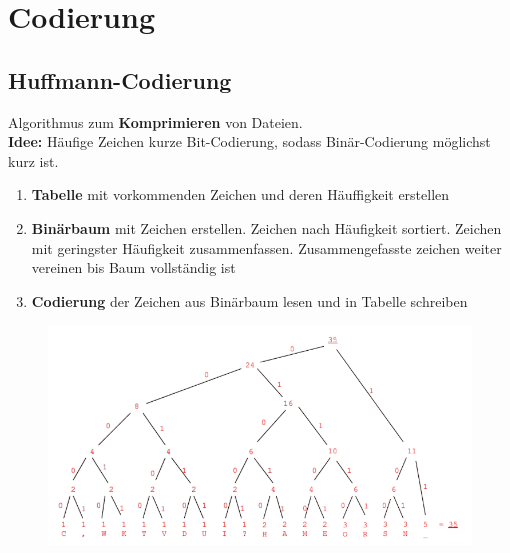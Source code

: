 \documentclass[12pt,a4paper]{article}
\begin{document}
		\newpage
	\section{Codierung}
		\subsection{Huffmann-Codierung}
			Algorithmus zum \textbf{Komprimieren} von Dateien.\\
			\textbf{Idee:} Häufige Zeichen kurze Bit-Codierung, sodass Binär-Codierung möglichst kurz ist.
			\begin{enumerate}
				\item \textbf{Tabelle} mit vorkommenden Zeichen und deren Häuffigkeit erstellen
				\item \textbf{Binärbaum} mit Zeichen erstellen. Zeichen nach Häufigkeit sortiert. Zeichen mit geringster Häufigkeit zusammenfassen. Zusammengefasste zeichen weiter vereinen bis Baum vollständig ist
				\item \textbf{Codierung} der Zeichen aus Binärbaum lesen und in Tabelle schreiben
			\end{enumerate}
			\begin{center}
				\begin{figure}[!h]
					\includegraphics[width=\textwidth]{Bilder/Huffmann-Baum.png}
				\end{figure}
			\end{center}
\end{document}
